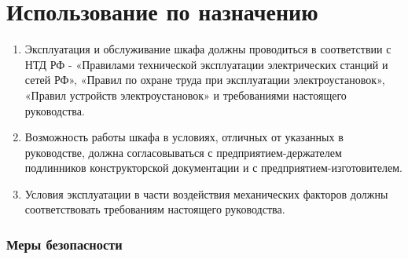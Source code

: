 \color{unidarkgreen}\section[Использование по назначению]{Использование по назначению}
\color{black}

\color{black}

\begin{enumerate}[label=\arabic{section}.\arabic{subsection}.\arabic*, align=left, labelsep=4pt, leftmargin=0pt, itemindent=2cm]
    
\item
Эксплуатация и обслуживание шкафа должны проводиться в соответствии с НТД РФ - «Правилами технической эксплуатации электрических станций и сетей РФ», «Правил по охране труда при эксплуатации электроустановок», «Правил устройств электроустановок» и требованиями настоящего руководства.

\item
Возможность работы шкафа в условиях, отличных от указанных в руководстве, должна согласовываться с предприятием-держателем подлинников конструкторской документации и с предприятием-изготовителем.

\item
Условия эксплуатации в части воздействия механических факторов должны соответствовать требованиям настоящего руководства.

\end{enumerate}

\color{black}
\subsubsection{Меры безопасности}

